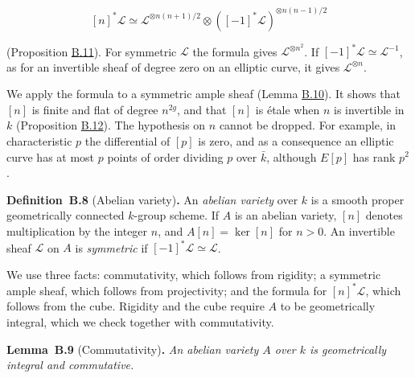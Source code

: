 \documentclass[11pt]{article}
\newenvironment{bpstatement}[2]{\par\addvspace{0.6\baselineskip}\noindent\textbf{#1}#2\textbf{.}\enspace\ignorespaces}
  {\par\addvspace{0.4\baselineskip}}
\newenvironment{bpstatementit}[2]{\begin{bpstatement}{#1}{#2}\itshape\ignorespaces}{\end{bpstatement}}
\begin{document}
\[
[n]^*\mathcal L\simeq\mathcal L^{\otimes n(n+1)/2}\otimes([-1]^*\mathcal L)^{\otimes n(n-1)/2}
\]

(Proposition \hyperref[bp31]{B.11}). For symmetric \(\mathcal L\) the formula gives \(\mathcal L^{\otimes n^2}\). If \([-1]^*\mathcal L\simeq\mathcal L^{-1}\), as for an invertible sheaf of degree zero on an elliptic curve, it gives \(\mathcal L^{\otimes n}\).

We apply the formula to a symmetric ample sheaf (Lemma \hyperref[bp29]{B.10}). It shows that \([n]\) is finite and flat of degree \(n^{2g}\), and that \([n]\) is étale when \(n\) is invertible in \(k\) (Proposition \hyperref[bp34]{B.12}). The hypothesis on \(n\) cannot be dropped. For example, in characteristic \(p\) the differential of \([p]\) is zero, and as a consequence an elliptic curve has at most \(p\) points of order dividing \(p\) over \(\bar k\), although \(E[p]\) has rank \(p^2\).

\label{bp24}%
\begin{bpstatement}{Definition~B.8}{ (Abelian variety)}
An \emph{abelian variety} over \(k\) is a smooth proper geometrically connected \(k\)-group scheme. If \(A\) is an abelian variety, \([n]\) denotes multiplication by the integer \(n\), and \(A[n]=\ker[n]\) for \(n>0\). An invertible sheaf \(\mathcal L\) on \(A\) is \emph{symmetric} if \([-1]^*\mathcal L\simeq\mathcal L\).
\end{bpstatement}

\label{bp25}%
We use three facts: commutativity, which follows from rigidity; a symmetric ample sheaf, which follows from projectivity; and the formula for \([n]^*\mathcal L\), which follows from the cube. Rigidity and the cube require \(A\) to be geometrically integral, which we check together with commutativity.

\label{bp26}%
\begin{bpstatementit}{Lemma~B.9}{ (Commutativity)}
An abelian variety \(A\) over \(k\) is geometrically integral and commutative.
\end{bpstatementit}
\end{document}

